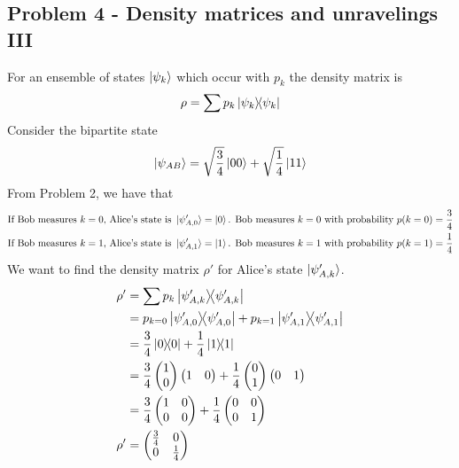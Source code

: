 \newpage
\subsection{Problem 4 - Density matrices and unravelings III}
For an ensemble of states $\ket{\psi_k}$ which occur with $p_k$ the density matrix is
\begin{equation}
    \rho = \sum p_k \ketbra{\psi_k}
\end{equation}
Consider the bipartite state
\begin{equation}
    \ket{\psi_{AB}} = \sqrt{\frac{3}{4}}\ket{00} + \sqrt{\frac{1}{4}}\ket{11}
\end{equation}
From Problem 2, we have that 
\begin{align*}
    \text{If Bob measures } k=0 \text{, Alice's state is } \ket{\psi'_{A,0}} = \ket{0} \text{. Bob measures } k=0 \text{ with probability } p(k=0) = \frac{3}{4} \\ 
    \text{If Bob measures } k=1 \text{, Alice's state is } \ket{\psi'_{A,1}} = \ket{1} \text{. Bob measures } k=1 \text{ with probability } p(k=1) = \frac{1}{4}
\end{align*}
We want to find the density matrix $\rho'$ for Alice's state $\ket{\psi'_{A,k}}$.
\begin{align}
    \rho' &= \sum p_k \ketbra{\psi'_{A,k}} \\ 
    &= p_{k=0}\ketbra{\psi'_{A,0}} + p_{k=1}\ketbra{\psi'_{A,1}} \\
    &= \frac{3}{4}\ketbra{0} + \frac{1}{4}\ketbra{1} \\
    &= \frac{3}{4}\begin{pmatrix}1 \\ 0\end{pmatrix}\begin{pmatrix}1 & 0\end{pmatrix} + \frac{1}{4}\begin{pmatrix}0 \\ 1\end{pmatrix}\begin{pmatrix}0 & 1\end{pmatrix} \\
    &= \frac{3}{4}\begin{pmatrix}1 & 0 \\ 0 & 0\end{pmatrix} + \frac{1}{4} \begin{pmatrix}0 & 0 \\ 0 & 1\end{pmatrix} \\
    \rho' &= \begin{pmatrix}\frac{3}{4} & 0 \\ 0 & \frac{1}{4}\end{pmatrix}
\end{align}
